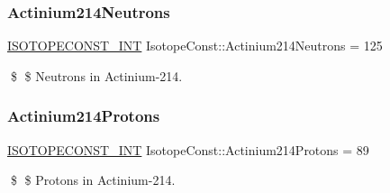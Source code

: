\subsubsection{\texorpdfstring{Actinium214\+Neutrons}{Actinium214Neutrons}}
{\footnotesize\ttfamily \mbox{\hyperlink{group___isotope_const-_macros_ga5f18360b3e99483a35c32d789e62621c}{I\+S\+O\+T\+O\+P\+E\+C\+O\+N\+S\+T\+\_\+\+I\+NT}} Isotope\+Const\+::\+Actinium214\+Neutrons = 125}

\$ \$ Neutrons in Actinium-\/214. \mbox{\label{group___isotope_const-_actinium-_ac214_ga1830e767f3726552055d0bde457e28ad}} 
\subsubsection{\texorpdfstring{Actinium214\+Protons}{Actinium214Protons}}
{\footnotesize\ttfamily \mbox{\hyperlink{group___isotope_const-_macros_ga5f18360b3e99483a35c32d789e62621c}{I\+S\+O\+T\+O\+P\+E\+C\+O\+N\+S\+T\+\_\+\+I\+NT}} Isotope\+Const\+::\+Actinium214\+Protons = 89}

\$ \$ Protons in Actinium-\/214. 